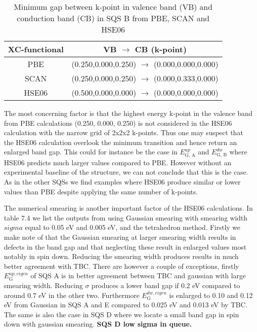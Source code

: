\begin{table}[H]
\centering
\begin{tabular}{@{}cc@{}}
\toprule
XC-functional & VB $\rightarrow$ CB (k-point)                              \\ \midrule
PBE           & (0.250,0.000,0.250) $\rightarrow$ (0.000,0.000,0.000)  \\
SCAN          & (0.250,0.000,0.250) $\rightarrow$ (0.000,0.333,0.000)  \\
HSE06         & (0.500,0.000,0.000) $\rightarrow$ (0.000,0.000,0.000) \\ \bottomrule
\end{tabular}
\caption{Minimum gap between k-point in valence band (VB) and conduction band (CB) in SQS B from PBE, SCAN and HSE06}
\end{table}

The most concerning factor is that the highest energy k-point in the valence band from PBE calculations (0.250, 0.000, 0.250) is not considered in the HSE06 calculation with the narrow grid of 2x2x2 k-points. Thus one may suspect that the HSE06 calculation overlook the minimum transition and hence return an enlarged band gap. This could for instance be the case in $E_\text{G, A} ^{up}$ and $E_\text{G, B} ^{dw}$ where HSE06 predicts much larger values compared to PBE. However without an experimental baseline of the structure, we can not conclude that this is the case. As in the other SQSs we find examples where HSE06 produce similar or lower values than PBE despite applying the same number of k-points. 

The numerical smearing is another important factor of the HSE06 calculations. In table 7.4 we list the outputs from using Gaussian smearing with smearing width $sigma$ equal to 0.05 eV and 0.005 eV, and the tetrahedron method. Firstly we make note of that the Gaussian smearing at larger smearing width results in defects in the band gap and that neglecting these result in enlarged values most notably in spin down. Reducing the smearing width produces results in much better agreement with TBC. There are however a couple of exceptions, firstly $E_\text{G} ^{up, eigen}$ of SQS A is in better agreement between TBC and gaussian with large smearing width. Reducing $\sigma$ produces a lower band gap if 0.2 eV compared to around 0.7 eV in the other two. Furthermore $E_\text{G} ^{dw, eigen}$ is enlarged to 0.10 and 0.12 eV from Gaussian in SQS A and E compared to 0.025 eV and 0.013 eV by TBC. The same is also the case in SQS D where we locate a small band gap in spin down with gaussian smearing. \textbf{SQS D  low sigma in queue.}

